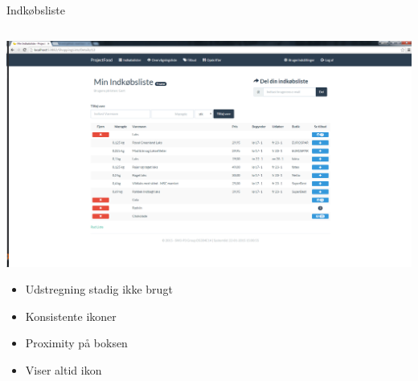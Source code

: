\begin{frame}{Indkøbsliste}

	
	\begin{minipage}[0.3\textheight]{\textwidth}
	\begin{columns}[T]
	\begin{column}{1\textwidth}
	
	 \includegraphics[width=1\textwidth,height=1\textheight,keepaspectratio, trim={1cm 0 0 16mm}, clip]{images/Screenshots/ShoppingList.png}
	 
	 \begin{itemize}
	 	\item Udstregning stadig ikke brugt
	 	\item Konsistente ikoner
	 	\item Proximity på boksen
	 	\item Viser altid ikon 
	 \end{itemize}
	
	\end{column}

	\end{columns}

  \end{minipage}
	
\end{frame}

